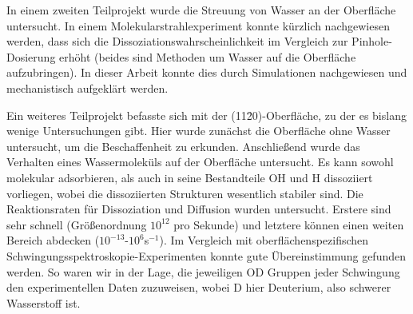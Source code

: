 \documentclass[11pt,DIV=13,a4paper,headinclude,german]{scrartcl}
\begin{document}
In einem zweiten Teilprojekt wurde die Streuung von Wasser an der Oberfläche untersucht.
In einem Molekularstrahlexperiment konnte kürzlich nachgewiesen werden, dass sich die Dissoziationswahrscheinlichkeit im Vergleich zur Pinhole-Dosierung erhöht (beides sind Methoden um Wasser auf die Oberfläche aufzubringen).
In dieser Arbeit konnte dies durch Simulationen nachgewiesen und mechanistisch aufgeklärt werden.

Ein weiteres Teilprojekt befasste sich mit der (11\=20)-Oberfläche, zu der es bislang wenige Untersuchungen gibt.
Hier wurde zunächst die Oberfläche ohne Wasser %
untersucht, um die Beschaffenheit zu erkunden.
Anschließend wurde das Verhalten eines Wassermoleküls auf der Oberfläche untersucht.
Es kann sowohl molekular adsorbieren, als auch in seine Bestandteile OH und H dissoziiert vorliegen, wobei die dissoziierten Strukturen wesentlich stabiler sind.
Die Reaktionsraten für Dissoziation und Diffusion wurden untersucht. Erstere sind sehr schnell (Größenordnung $10^{12}$ pro Sekunde) und letztere können einen weiten Bereich abdecken ($10^{-13}$-$10^6$s$^{-1}$).
Im Vergleich mit oberflächenspezifischen Schwin\-gungs\-spek\-tros\-ko\-pie-Experimenten konnte gute Übereinstimmung gefunden werden.
So waren wir in der Lage, die jeweiligen OD Gruppen jeder Schwingung den experimentellen Daten zuzuweisen, wobei D hier Deuterium, also schwerer Wasserstoff ist.
\end{document}
